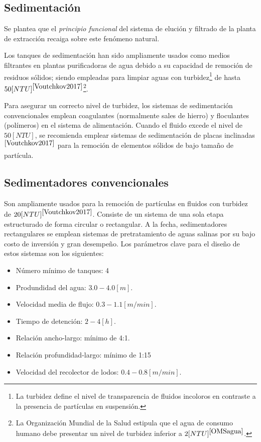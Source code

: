 \begin{center}
	\section{Sedimentaci\'on}
\end{center}

\noindent
\justify

Se plantea que el \textit{principio funcional} del sistema de eluci\'on y filtrado de la planta de extracci\'on recaiga sobre este fen\'omeno natural.

\noindent
\justify

Los tanques de sedimentaci\'on han sido ampliamente usados como medios filtrantes en plantas purificadoras de agua debido a su capacidad de remoci\'on de residuos s\'olidos; siendo empleadas para limpiar aguas con turbidez\footnote{La turbidez define el nivel de transparencia de fluidos incoloros en contraste a la presencia de part\'iculas en suspensi\'on.} de hasta $50 [NTU]^{\cite{Voutchkov2017}}$\footnote{La Organizaci\'on Mundial de la Salud estipula que el agua de consumo humano debe presentar un nivel de turbidez inferior a $2 [NTU]^{\cite{OMSagua}}$.}. 

\noindent
\justify

Para asegurar un correcto nivel de turbidez, los sistemas de sedimentaci\'on convencionales emplean coagulantes (normalmente sales de hierro) y floculantes (pol\'imeros) en el sistema de alimentaci\'on. Cuando el fluido excede el nivel de $50 [NTU]$, se recomienda emplear sistemas de sedimentaci\'on de placas inclinadas$^{\cite{Voutchkov2017}}$ para la remoci\'on de elementos s\'olidos de bajo tama\~no de part\'icula.


\subsection{Sedimentadores convencionales}

\noindent
\justify

Son ampliamente usados para la remoci\'on de part\'iculas en fluidos con turbidez de $20 [NTU]^{\cite{Voutchkov2017}}$. Consiste de un sistema de una sola etapa estructurado de forma circular o rectangular. A la fecha, sedimentadores rectangulares se emplean sistemas de pretratamiento de aguas salinas por su bajo costo de inversi\'on y gran desempe\~no. Los par\'ametros clave para el dise\~no de estos sistemas son los siguientes:

\begin{itemize}
	\item N\'umero m\'inimo de tanques: 4
	\item Produndidad del agua: $3.0 - 4.0 [m]$.
	\item Velocidad media de flujo: $0.3 - 1.1 [m/min]$.
	\item Tiempo de detenci\'on: $2 - 4 [h]$.
	\item Relaci\'on ancho-largo: m\'inimo de 4:1.
	\item Relaci\'on profundidad-largo: m\'inimo de 1:15 
	\item Velocidad del recolector de lodos: $0.4 - 0.8 [m/min]$.
\end{itemize}

